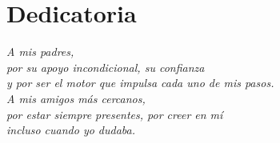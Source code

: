 \chapter*{Dedicatoria}
\thispagestyle{plain}

\vspace{4cm}
\begin{flushright}
\textit{A mis padres,\\
por su apoyo incondicional, su confianza\\
y por ser el motor que impulsa cada uno de mis pasos.\\[1em]
A mis amigos más cercanos,\\
por estar siempre presentes, por creer en mí\\
incluso cuando yo dudaba.}
\end{flushright}
\clearpage
